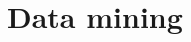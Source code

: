 \documentclass[fleqn,10pt]{SelfArx} %
\begin{document}





\clearpage
\newpage

\section*{Data mining} %
\end{document}

